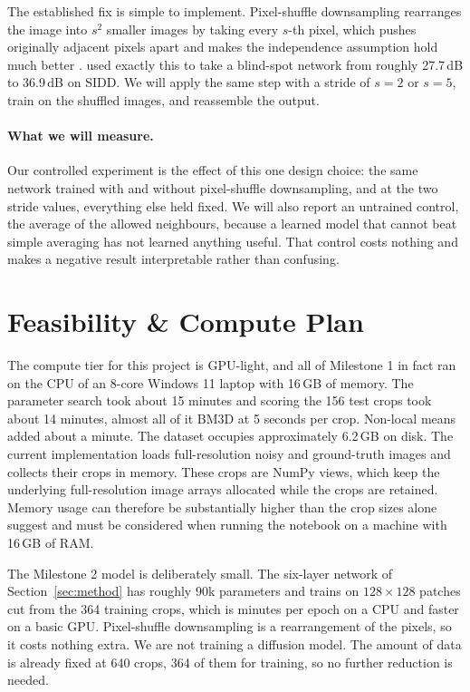 \documentclass[11pt]{article}
\begin{document}
The established fix is simple to implement. Pixel-shuffle downsampling rearranges the image
into $s^2$ smaller images by taking every $s$-th pixel, which pushes originally adjacent
pixels apart and makes the independence assumption hold much better
\citep{zhou2020awgn}. \citet{lee2022apbsn} used exactly this to take a blind-spot network
from roughly 27.7\,dB to 36.9\,dB on SIDD. We will apply the same step with a stride of
$s = 2$ or $s = 5$, train on the shuffled images, and reassemble the output.

\paragraph{What we will measure.}
Our controlled experiment is the effect of this one design choice: the same network trained
with and without pixel-shuffle downsampling, and at the two stride values, everything else
held fixed. We will also report an untrained control, the average of the allowed
neighbours, because a learned model that cannot beat simple averaging has not learned
anything useful. That control costs nothing and makes a negative result interpretable
rather than confusing.

\section{Feasibility \& Compute Plan}
\label{sec:feasibility}
The compute tier for this project is GPU-light, and all of Milestone 1 in fact ran on the
CPU of an 8-core Windows 11 laptop with 16\,GB of memory. The parameter search took about
15 minutes and scoring the 156 test crops took about 14 minutes, almost all of it BM3D at
5 seconds per crop. Non-local means added about a minute. The dataset occupies
approximately 6.2\,GB on disk. The current implementation loads full-resolution noisy
and ground-truth images and collects their crops in memory. These crops are NumPy views,
which keep the underlying full-resolution image arrays allocated while the crops are
retained. Memory usage can therefore be substantially higher than the crop sizes alone
suggest and must be considered when running the notebook on a machine with 16\,GB of RAM.

The Milestone 2 model is deliberately small. The six-layer network of
Section~\ref{sec:method} has roughly 90k parameters and trains on $128\times128$ patches
cut from the 364 training crops, which is minutes per epoch on a CPU and faster on a basic
GPU. Pixel-shuffle downsampling is a rearrangement of the pixels, so it costs nothing
extra. We are not training a diffusion model. The amount of data is already fixed at 640
crops, 364 of them for training, so no further reduction is needed.
\end{document}
